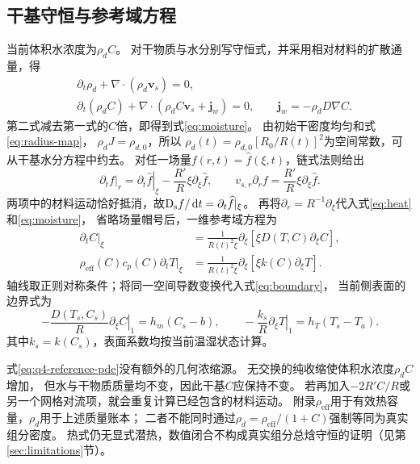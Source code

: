 \subsection{干基守恒与参考域方程}

当前体积水浓度为$\rho_d C$。
对干物质与水分别写守恒式，并采用相对材料的扩散通量，得
\begin{equation}
 \begin{aligned}
  &\partial_t\rho_d+\nabla\cdot(\rho_d\boldsymbol v_s)=0,\\
  &\partial_t(\rho_d C)
   +\nabla\cdot(\rho_d C\boldsymbol v_s+\boldsymbol j_w)=0,
  \qquad \boldsymbol j_w=-\rho_dD\nabla C.
 \end{aligned}
 \label{eq:q4-component-balance}
\end{equation}
第二式减去第一式的$C$倍，即得到式\eqref{eq:moisture}。
由初始干密度均匀和式\eqref{eq:radius-map}，
$\rho_d J=\rho_{d,0}$，所以
$\rho_d(t)=\rho_{d,0}[R_0/R(t)]^2$为空间常数，可从干基水分方程中约去。
对任一场量$f(r,t)=\widehat f(\xi,t)$，链式法则给出
\begin{equation}
 \left.\partial_t f\right|_r
 =\left.\partial_t\widehat f\right|_\xi
   -\frac{R'}R\xi\partial_\xi\widehat f,
 \qquad
 v_{s,r}\partial_r f=\frac{R'}R\xi\partial_\xi\widehat f.
 \label{eq:q4-chain-rule}
\end{equation}
两项中的材料运动恰好抵消，故$\mathrm D_{\mathrm s} f/\mathop{}\!\mathrm d t=\partial_t\widehat f|_\xi$。
再将$\partial_r=R^{-1}\partial_\xi$代入式\eqref{eq:heat}和\eqref{eq:moisture}，
省略场量帽号后，一维参考域方程为
\begin{equation}
 \begin{aligned}
  \left.\partial_t C\right|_\xi
   &=\frac{1}{R(t)^2\xi}\partial_\xi
     \left[\xi D(T,C)\partial_\xi C\right],\\
  \rho_{\mathrm{eff}}(C)c_p(C)
   \left.\partial_t T\right|_\xi
   &=\frac{1}{R(t)^2\xi}\partial_\xi
     \left[\xi k(C)\partial_\xi T\right].
 \end{aligned}
 \label{eq:q4-reference-pde}
\end{equation}
轴线取正则对称条件；将同一空间导数变换代入式\eqref{eq:boundary}，
当前侧表面的边界式为
\begin{equation}
 -\frac{D(T_s,C_s)}{R}\left.\partial_\xi C\right|_1=h_m(C_s-b),
 \qquad
 -\frac{k_s}{R}\left.\partial_\xi T\right|_1=h_T(T_s-T_a).
 \label{eq:q4-reference-boundary}
\end{equation}
其中$k_s=k(C_s)$，表面系数均按当前温湿状态计算。

式\eqref{eq:q4-reference-pde}没有额外的几何浓缩源。
无交换的纯收缩使体积水浓度$\rho_d C$增加，
但水与干物质质量均不变，因此干基$C$应保持不变。
若再加入$-2R'C/R$或另一个网格对流项，就会重复计算已经包含的材料运动。
附录$\rho_{\mathrm{eff}}$用于有效热容量，$\rho_d$用于上述质量账本；
二者不能同时通过$\rho_d=\rho_{\mathrm{eff}}/(1+C)$强制等同为真实组分密度。
热式仍无显式潜热，数值闭合不构成真实组分总焓守恒的证明（见第\ref{sec:limitations}节）。


